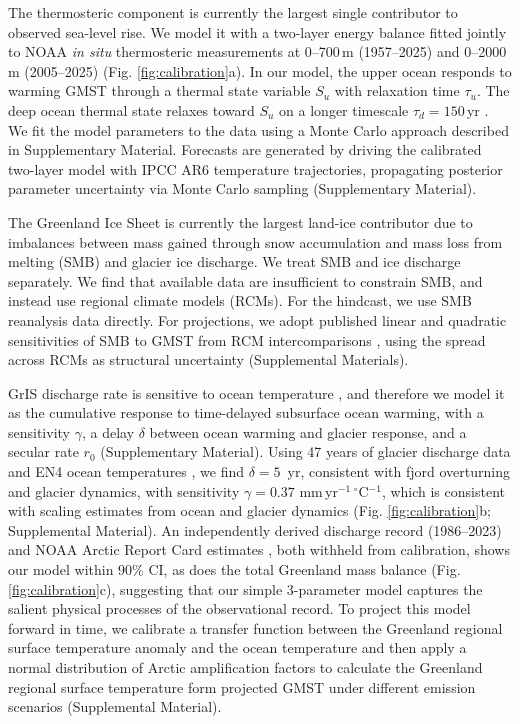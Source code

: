 \documentclass[12pt]{article}
\begin{document}
The thermosteric component is currently the largest single contributor to observed sea-level rise. We model it with a two-layer energy balance \citep{Geoffroy2013} fitted jointly to NOAA \emph{in situ} thermosteric measurements at 0--700\,m (1957--2025) and 0--2000\,m (2005--2025) \citep{Levitus2012} (Fig. \ref{fig:calibration}a). In our model, the upper ocean responds to warming GMST through a thermal state variable $S_u$ with relaxation time $\tau_u$. The deep ocean thermal state relaxes toward $S_u$ on a longer timescale $\tau_d = 150$\,yr \citep{Geoffroy2013}. We fit the model parameters to the data using a Monte Carlo approach described in Supplementary Material. Forecasts are generated by driving the calibrated two-layer model with IPCC AR6 temperature trajectories, propagating posterior parameter uncertainty via Monte Carlo sampling (Supplementary Material).

The Greenland Ice Sheet is currently the largest land-ice contributor due to imbalances between mass gained through snow accumulation and mass loss from melting (SMB) and glacier ice discharge. We treat SMB and ice discharge separately. We find that available data are insufficient to constrain SMB, and instead use regional climate models (RCMs). For the hindcast, we use SMB reanalysis data \citep{Mouginot2019, Noel2018} directly. For projections, we adopt published linear and quadratic sensitivities of SMB to GMST from RCM intercomparisons \citep{Fettweis2020, Noel2021}, using the spread across RCMs as structural uncertainty \citep{Glaude2024} (Supplemental Materials). 

GrIS discharge rate is sensitive to ocean temperature \citep{Straneo2013}, and therefore we model it as the cumulative response to time-delayed subsurface ocean warming, with a sensitivity $\gamma$, a delay $\delta$ between ocean warming and glacier response, and a secular rate $r_0$ (Supplementary Material). Using 47 years of glacier discharge data \citep{Mouginot2019} and EN4 ocean temperatures \citep{Good2013}, we find $\delta = 5$~yr, consistent with fjord overturning and glacier dynamics, with sensitivity $\gamma = 0.37$ mm\,yr$^{-1}\,^\circ$C$^{-1}$, which is consistent with scaling estimates from ocean and glacier dynamics (Fig. \ref{fig:calibration}b; Supplemental Material). An independently derived discharge record (1986--2023) \citep{Mankoff2021} and NOAA Arctic Report Card estimates \citep{Poinar2026}, both withheld from calibration, shows our model within 90\% CI, as does the total Greenland mass balance (Fig. \ref{fig:calibration}c), suggesting that our simple 3-parameter model captures the salient physical processes of the observational record. To project this model forward in time, we calibrate a transfer function between the Greenland regional surface temperature anomaly and the ocean temperature and then apply a normal distribution of Arctic amplification factors to calculate the Greenland regional surface temperature form projected GMST under different emission scenarios (Supplemental Material). 
\end{document}
